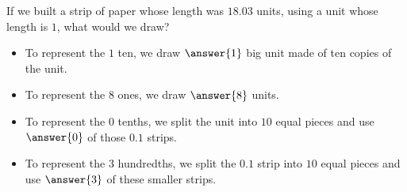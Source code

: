 \documentclass{ximera}
\begin{document}
\begin{question}
If we built a strip of paper whose length was $18.03$ units, using a unit whose length is $1$, what would we draw?

\begin{prompt}
	\begin{itemize}
		\item To represent the $1$ ten, we draw $\answer{1}$ big unit made of ten copies of the unit.
		\item To represent the $8$ ones, we draw $\answer{8}$ units.
		\item To represent the $0$ tenths, we split the unit into $10$ equal pieces and use $\answer{0}$ of those $0.1$ strips.
		\item To represent the $3$ hundredths, we split the $0.1$ strip into $10$ equal pieces and use $\answer{3}$ of these smaller strips.
	\end{itemize}
\end{prompt}
\end{question}
\end{document}
